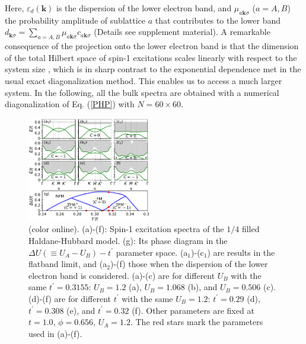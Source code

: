 \documentclass[amsmath,superscriptaddress,showpacs,aps,prl,twocolumn]{revtex4-1}
\begin{document}
Here, $\varepsilon_d(\mathbf{k})$ is the dispersion of the lower electron band, and $\mu_{a\mathbf{k}\sigma}$ ($a=A,B$) the probability amplitude of sublattice $a$ that contributes to the lower band $d_{\mathbf{k}\sigma}=\sum_{a=A,B}\mu_{a\mathbf{k}\sigma}c_{a\mathbf{k}\sigma}$ (Details see supplement material). A remarkable consequence of the projection onto the lower electron band is that the dimension of the total Hilbert space of spin-1 excitations scales linearly with respect to the system size \cite{Su_PRB2018,Su_PRB2019}, which is in sharp contrast to the exponential dependence met in the usual exact diagonalization method. This enables us to access a much larger system. In the following, all the bulk spectra are obtained with a numerical diagonalization of Eq. (\ref{PHP}) with $N=60\times60$.

\begin{figure}
\centering
\includegraphics[width=0.48\textwidth]{bulkresult}
\caption{(color online). (a)-(f): Spin-1 excitation spectra of the $1/4$ filled Haldane-Hubbard model. (g): Its phase diagram in the $\Delta U(\equiv U_A-U_B)-t^\prime$ parameter space. (a$_1$)-(c$_1$) are results in the flatband limit, and (a$_2$)-(f) those when the dispersion of the lower electron band is considered.
(a)-(c) are for different $U_B$ with the same $t^\prime=0.3155$: $U_B=1.2$ (a), $U_B=1.068$ (b), and $U_B=0.506$ (c). (d)-(f) are for different $t^\prime$ with the same $U_B=1.2$: $t^\prime=0.29$ (d), $t^\prime=0.308$ (e), and  $t^\prime=0.32$ (f). Other parameters are fixed at $t=1.0$, $\phi=0.656$, $U_A=1.2$. The red stars mark the parameters used in (a)-(f).}
\label{bulkresult}
\end{figure}
\end{document}
